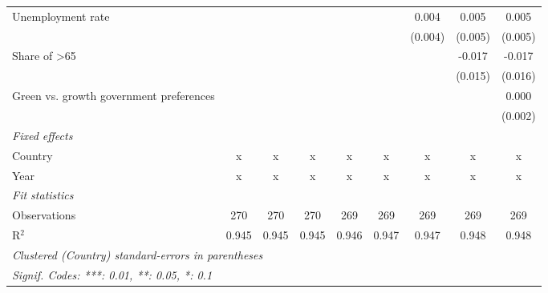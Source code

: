 \begin{table}[htbp]
\begin{tabular}{lcccccccc}
      Unemployment rate                                       &         &         &         &         &         & 0.004   & 0.005   & 0.005\\   
                                                              &         &         &         &         &         & (0.004) & (0.005) & (0.005)\\   
      Share of >65                                            &         &         &         &         &         &         & -0.017  & -0.017\\   
                                                              &         &         &         &         &         &         & (0.015) & (0.016)\\   
      Green vs. growth government preferences                 &         &         &         &         &         &         &         & 0.000\\   
                                                              &         &         &         &         &         &         &         & (0.002)\\   
      \emph{Fixed effects}\\
      Country                                                 & x       & x       & x       & x       & x       & x       & x       & x\\  
      Year                                                    & x       & x       & x       & x       & x       & x       & x       & x\\  
      \midrule \emph{Fit statistics}\\
      Observations                                            & 270     & 270     & 270     & 269     & 269     & 269     & 269     & 269\\  
      R$^2$                                                   & 0.945   & 0.945   & 0.945   & 0.946   & 0.947   & 0.947   & 0.948   & 0.948\\  
      \midrule
      \multicolumn{9}{l}{\emph{Clustered (Country) standard-errors in parentheses}}\\
      \multicolumn{9}{l}{\emph{Signif. Codes: ***: 0.01, **: 0.05, *: 0.1}}\\
   \end{tabular}
\end{table}


